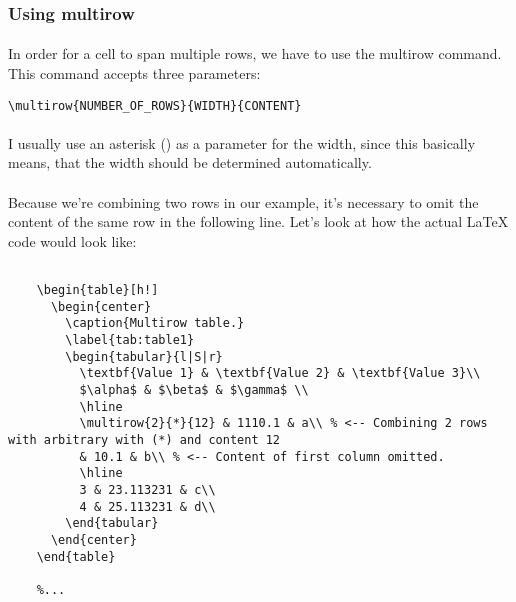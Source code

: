   \subsubsection{Using multirow}
  \paragraph{}
  In order for a cell to span multiple rows, we have to use the multirow command. This command accepts three parameters:
   
  \begin{lstlisting}[language={[LaTeX]TeX},breaklines=true,frame=single]
    \multirow{NUMBER_OF_ROWS}{WIDTH}{CONTENT}
  \end{lstlisting}

  \paragraph{}
  I usually use an asterisk (\text{*}) as a parameter for the width,
  since this basically means, that the width should be determined
  automatically.

  \paragraph{}
  Because we're combining two rows in our example, it's necessary to omit the content of the same row in the following line. Let's look at how the actual LaTeX code would look like:

  \begin{lstlisting}[language={[LaTeX]TeX},breaklines=true,frame=single]
    %...

    \begin{table}[h!]
      \begin{center}
        \caption{Multirow table.}
        \label{tab:table1}
        \begin{tabular}{l|S|r}
          \textbf{Value 1} & \textbf{Value 2} & \textbf{Value 3}\\
          $\alpha$ & $\beta$ & $\gamma$ \\
          \hline
          \multirow{2}{*}{12} & 1110.1 & a\\ % <-- Combining 2 rows with arbitrary with (*) and content 12
          & 10.1 & b\\ % <-- Content of first column omitted.
          \hline
          3 & 23.113231 & c\\
          4 & 25.113231 & d\\
        \end{tabular}
      \end{center}
    \end{table}
    
    %...
  \end{lstlisting}
